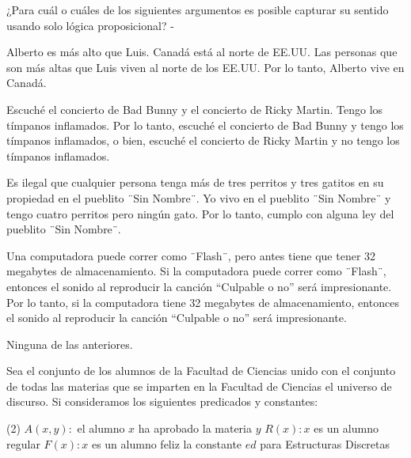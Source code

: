 \documentclass[12pt, a4paper]{exam}
\makeatletter
\renewenvironment{checkboxes}%
   {\setcounter{choice}{0}\list{\checkbox@char}%
      {%
        \settowidth{\leftmargin}{W.\hskip\labelsep\hskip 2.5em}%
        \def\choice{%
          \if@correctchoice
            \color@endgroup \endgroup
          \fi
          \stepcounter{choice}
          \item[\checked@char]
          \do@choice@pageinfo
        } %
        \def\CorrectChoice{%
          \if@correctchoice
            \color@endgroup \endgroup
          \fi
          \ifprintanswers
            \ifhmode \unskip\unskip\unvbox\voidb@x \fi
            \begingroup \color@begingroup \@correctchoicetrue
            \CorrectChoice@Emphasis
            \stepcounter{choice}
            \item[\checked@char]
          \else
            \stepcounter{choice}
            \item[\checked@char]
          \fi
          \do@choice@pageinfo
        } %
        \let\correctchoice\CorrectChoice
        \labelwidth\leftmargin\advance\labelwidth-\labelsep
        \topsep=0pt
        \partopsep=0pt
        \checkboxeshook
      }%
   }%
   {\if@correctchoice \color@endgroup \endgroup \fi \endlist}
\makeatother
\begin{document}
    \begin{questions}
        \question
        {
            ¿Para cuál o cuáles de los siguientes argumentos es posible 
            capturar su sentido usando solo lógica proposicional?
        }
        \begin{checkboxes}
            \choice Alberto es más alto que Luis. Canadá está al norte de 
            EE.UU. Las personas que son más altas que Luis viven al norte 
            de los EE.UU. Por lo tanto, Alberto vive en Canadá. 

            \choice Escuché el concierto de Bad Bunny y el concierto de Ricky 
            Martin. Tengo los tímpanos inflamados. Por lo tanto, escuché el 
            concierto de Bad Bunny y tengo los tímpanos inflamados, o bien, 
            escuché el concierto de Ricky Martin y no tengo los tímpanos 
            inflamados. %

            \choice Es ilegal que cualquier persona tenga más de tres perritos 
            y tres gatitos en su propiedad en el pueblito ¨Sin Nombre¨. Yo 
            vivo en el pueblito ¨Sin Nombre¨ y tengo cuatro perritos pero 
            ningún gato. Por lo tanto, cumplo con alguna ley del pueblito 
            ¨Sin Nombre¨.

            \choice Una computadora puede correr como ¨Flash¨, pero antes 
            tiene que tener 32 megabytes de almacenamiento. Si la computadora 
            puede correr como ¨Flash¨, entonces el sonido al reproducir la 
            canción “Culpable o no” será impresionante. Por lo tanto, si 
            la computadora tiene 32 megabytes de almacenamiento, entonces 
            el sonido al reproducir la canción “Culpable o no” será 
            impresionante. %

            \choice Ninguna de las anteriores.
        \end{checkboxes}

        \question
        {
            Sea el conjunto de los alumnos de la Facultad de Ciencias unido 
            con el conjunto de todas las materias que se imparten en la 
            Facultad de Ciencias el universo de discurso. Si consideramos los 
            siguientes predicados y constantes:
            \begin{tasks}(2)
                \task $A(x,y):$ el alumno $x$ ha aprobado la materia $y$
                \task $R(x): x$ es un alumno regular 
                \task $F(x): x$ es un alumno feliz 
                \task la constante $ed$ para Estructuras Discretas 
            \end{tasks}

}
\end{questions}
\end{document}
